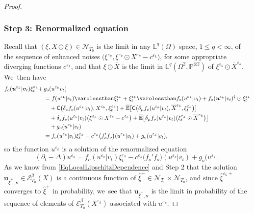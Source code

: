 \documentclass[JEP,XML,SOM,Unicode,published]{cedram}
\theoremstyle{definition}
\let\epsilon\varepsilon
\newcommand\bbE{\mathbb{E}}
\newcommand{\mcE}{\mathcal{E}}
\newcommand{\mcN}{\mathcal{N}}
\newcommand{\bbL}{\mathbb{L}}
\newcommand{\bbP}{\mathbb{P}}
\newcommand{\bsu}{\boldsymbol{u}}
\newcommand{\bsv}{\boldsymbol{v}}
\begin{document}
\begin{proof}
\subsubsection*{Step 3: Renormalized equation} Recall that $(\xi,X\odot\xi)\in\boldsymbol{\mcN}_{T_0}$ is the limit in any $\bbL^q(\Omega)$ space, $1\leq q<\infty$, of the sequence of enhanced noises $\bigl(\xi^{\epsilon_k}, \xi^{\epsilon_k}\odot X^{\epsilon_k} - c^{\epsilon_k}\bigr)$, for some appropriate diverging functions $c^{\epsilon_k}$, and that $\xi\odot\overline X$ is the limit in $\bbL^q(\Omega^2,\bbP^{\otimes 2})$ of $\xi^{\epsilon_k}\odot \overline{X}^{\epsilon_k} $. We~then have
\begin{align*}
f_o(\bsu^{\epsilon_k} \vert \bsv_t)\xi^{\epsilon_k}_t +\,& g_o(u^{\epsilon_k} v_t) \\
&= f(u^{\epsilon_k} \vert v_t) \varolessthan \xi^{\epsilon_k}_t + \xi^{\epsilon_k}_t \varolessthan f_o(u^{\epsilon_k} \vert v_t) + f_o(\bsu^{\epsilon_k} \vert v_t)^\sharp\odot \xi^{\epsilon_k}_t
\\
&\quad+ \mathsf{C} \bigl(\delta_z f_o(u^{\epsilon_k} \vert v_t), X^{\epsilon_k},\xi^{\epsilon_k}_t) + \overline{\bbE}\bigl[ \mathsf{C} \bigl(\delta_\mu f_o(u^{\epsilon_k} \vert v_t), \overline{X}^{\epsilon_k},\xi^{\epsilon_k}_t \bigr)\bigr]
\\
&\quad+ \delta_z f_o(u^{\epsilon_k} \vert v_t) \bigl(\xi^{\epsilon_k}\odot X^{\epsilon_k} - c^{\epsilon_k}\bigr) + \overline{\bbE}\bigl[ \delta_\mu f_o(u^{\epsilon_k} \vert v_t) \bigl(\xi^{\epsilon_k}_t \odot \overline{X}^{\epsilon_k} \bigr) \bigr]
\\
&\quad+ g_o(u^{\epsilon_k} \vert v_t)
\\
&= f_o(u^{\epsilon_k} \vert v_t) \xi^{\epsilon_k}_t - c^{\epsilon_k} \bigl(f_o'f_o\bigr)(u^{\epsilon_k} \vert v_t) + g_o(u^{\epsilon_k} \vert v_t),
\end{align*}
so the function $u^{\epsilon_k}$ is a solution of the renormalized equation
\[
(\partial_t-\Delta)u^{\epsilon_k} = f_o(u^{\epsilon_k} \vert v_t) \xi^{\epsilon_k}_t - c^{\epsilon_k} \bigl(f_o'f_o\bigr)(u^{\epsilon_k} \vert v_t) + g_o(u^{\epsilon_k} \vert.
\]
As we know from \eqref{EqLocalLipschitzDependence} and Step 2 that the solution $\bsu_{\widehat\xi^+,\bsv}\in \mcE^\beta_{T_0}(X)$ is a continuous function of $\widehat\xi^+\in\boldsymbol{\mcN}_{T_0}\times\boldsymbol{\mcN}_{T_0}$, and since $\widehat\xi^{\epsilon_k+}$ converges to $\widehat\xi^+$ in probability, we~see that $\bsu_{\widehat\xi^+,\bsv}$ is the limit in probability of the sequence of elements of $\mcE^\beta_{T_0}(X^{\epsilon_k})$ associated with $u^{\epsilon_k}$.
\end{proof}
\end{document}
